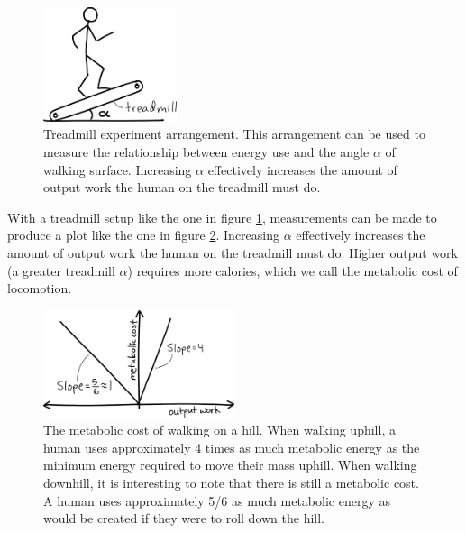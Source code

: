 \begin{figure}[htb]		%
\begin{centering}
\includegraphics[width=0.35\textwidth]{Figures/Treadmill}\par
\end{centering}
\caption[Diagram: Treadmill Experiment Arrangement]{Treadmill experiment arrangement. This arrangement can be used to measure the relationship between energy use and the angle $\alpha$ of walking surface. Increasing $\alpha$ effectively increases the amount of output work the human on the treadmill must do.}
\label{fig:Treadmill}
\end{figure}
%

With a treadmill setup like the one in figure \ref{fig:Treadmill}, measurements can be made to produce a plot like the one in figure \ref{fig:MetabolicCost}. Increasing $\alpha$ effectively increases the amount of output work the human on the treadmill must do. Higher output work (a greater treadmill $\alpha$) requires more calories, which we call the metabolic cost of locomotion. 

\begin{figure}[htb]		%
\begin{centering}
\includegraphics[width=0.5\textwidth]{Figures/MetabolicCost}\par
\end{centering}
\caption[Plot: The Metabolic Cost of Walking on a Hill]{The metabolic cost of walking on a hill.  When walking uphill, a human uses approximately 4 times as much metabolic energy as the minimum energy required to move their mass uphill. When walking downhill, it is interesting to note that there is still a metabolic cost. A human uses approximately 5/6 as much metabolic energy as would be created if they were to roll down the hill.}
\label{fig:MetabolicCost}
\end{figure}
%

